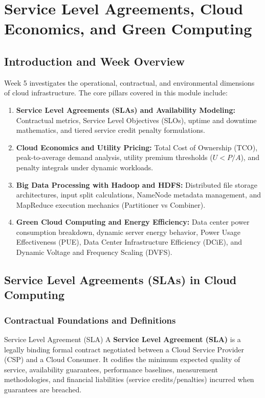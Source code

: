 \chapter{Service Level Agreements, Cloud Economics, and Green Computing}

\section{Introduction and Week Overview}
Week 5 investigates the operational, contractual, and environmental dimensions of cloud infrastructure. The core pillars covered in this module include:
\begin{enumerate}[leftmargin=*]
  \item \textbf{Service Level Agreements (SLAs) and Availability Modeling:} Contractual metrics, Service Level Objectives (SLOs), uptime and downtime mathematics, and tiered service credit penalty formulations.
  \item \textbf{Cloud Economics and Utility Pricing:} Total Cost of Ownership (TCO), peak-to-average demand analysis, utility premium thresholds ($U < P/A$), and penalty integrals under dynamic workloads.
  \item \textbf{Big Data Processing with Hadoop and HDFS:} Distributed file storage architectures, input split calculations, NameNode metadata management, and MapReduce execution mechanics (Partitioner vs Combiner).
  \item \textbf{Green Cloud Computing and Energy Efficiency:} Data center power consumption breakdown, dynamic server energy behavior, Power Usage Effectiveness (PUE), Data Center Infrastructure Efficiency (DCiE), and Dynamic Voltage and Frequency Scaling (DVFS).
\end{enumerate}

\section{Service Level Agreements (SLAs) in Cloud Computing}
\subsection{Contractual Foundations and Definitions}
\begin{defbox}{Service Level Agreement (SLA)}
A \textbf{Service Level Agreement (SLA)} is a legally binding formal contract negotiated between a Cloud Service Provider (CSP) and a Cloud Consumer. It codifies the minimum expected quality of service, availability guarantees, performance baselines, measurement methodologies, and financial liabilities (service credits/penalties) incurred when guarantees are breached.
\end{defbox}

